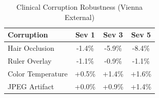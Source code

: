\begin{table}[h]
\centering
\caption{Clinical Corruption Robustness (Vienna External)}
\begin{tabular}{lccc}
\toprule
Corruption & Sev 1 & Sev 3 & Sev 5 \\
\midrule
Hair Occlusion & -1.4\% & -5.9\% & -8.4\% \\
Ruler Overlay & -1.1\% & -0.9\% & -1.1\% \\
Color Temperature & +0.5\% & +1.4\% & +1.6\% \\
JPEG Artifact & +0.0\% & +0.9\% & +1.4\% \\
\bottomrule
\end{tabular}
\label{tab:corruptions}
\end{table}
